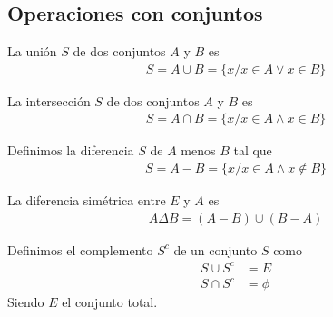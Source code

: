 \documentclass{../Topologia.tex}
\begin{document}
\subsection{Operaciones con conjuntos}
\begin{defin}
	La unión $S$ de dos conjuntos $A$ y $B$ es
	\begin{equation}
		\begin{split}
			S = A \cup B = \{x / x \in A \vee x \in B \}
		\end{split}
	\end{equation}
\end{defin}
\begin{defin}
	La intersección $S$ de dos conjuntos $A$ y $B$ es
	\begin{equation}
		\begin{split}
			S = A \cap B = \{ x / x \in A \wedge x \in B \}
		\end{split}
	\end{equation}
\end{defin}
\begin{defin}
	Definimos la diferencia $S$ de $A$ menos $B$ tal que
	\begin{equation}
		\begin{split}
			S = A - B = \{ x / x \in A \wedge x \notin B  \}
		\end{split}
	\end{equation}
\end{defin}
\begin{defin}
	La diferencia simétrica entre $E$ y $A$ es
	\begin{equation}
		\begin{split}
			A \Delta B = (A-B)\cup (B-A)
		\end{split}
	\end{equation}
\end{defin}

\begin{defin}
	Definimos el complemento $S^{c}$ de un conjunto $S$ como
	\begin{equation}
		\begin{split}
			S \cup S^{c} &= E\\
			S \cap S^{c} &= \phi
		\end{split}
	\end{equation}
	Siendo $E$ el conjunto total. 
\end{defin}
\end{document}
